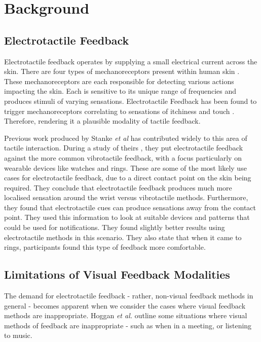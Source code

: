 \documentclass{mpaper}
\begin{document}
\section{Background}
\subsection{Electrotactile Feedback}
Electrotactile feedback operates by supplying a small electrical current across the skin. There are four types of mechanoreceptors present within human skin \cite{10.1145/3491102.3501863, hand_book}. These mechanoreceptors are each responsible for detecting various actions impacting the skin. Each is sensitive to its unique range of frequencies and produces stimuli of varying sensations. Electrotactile Feedback has been found to trigger mechanoreceptors correlating to sensations of itchiness and touch \cite{9086329, artificial_skin}. Therefore, rendering it a plausible modality of tactile feedback.

Previous work produced by Stanke \emph{et al} has contributed widely to this area of tactile interaction. During a study of theirs \cite{rings_and_watch}, they put electrotactile feedback against the more common vibrotactile feedback, with a focus particularly on wearable devices like watches and rings. These are some of the most likely use cases for electrotactile feedback, due to a direct contact point on the skin being required. They conclude that electrotactile feedback produces much more localised sensation around the wrist versus vibrotactile methods. Furthermore, they found that electrotactile cues can produce sensations away from the contact point. They used this information to look at suitable devices and patterns that could be used for notifications. They found slightly better results using electrotactile methods in this scenario. They also state that when it came to rings, participants found this type of feedback more comfortable. 

\subsection{Limitations of Visual Feedback Modalities}
The demand for electrotactile feedback - rather, non-visual feedback methods in general - becomes apparent when we consider the cases where visual feedback methods are inappropriate. Hoggan \emph{et al.} \cite{10.1145/1322192.1322222} outline some situations where visual methods of feedback are inappropriate - such as when in a meeting, or listening to music.
\end{document}
